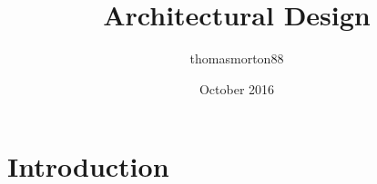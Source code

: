 \documentclass{article}
\title{Architectural Design}
\author{thomasmorton88 }
\date{October 2016}
\begin{document}
\maketitle

\section{Introduction}
\end{document}
